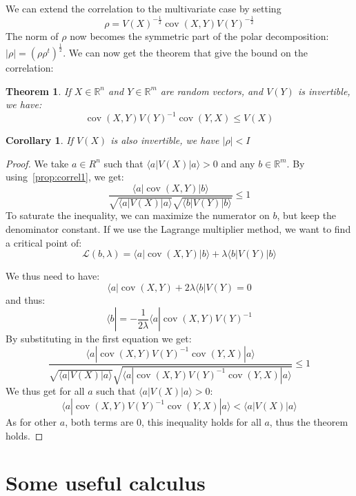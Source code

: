 \documentclass[10pt,a4paper]{report}
\theoremstyle{plain}
\newtheorem{thm}{Theorem}[chapter]
\newtheorem{cor}{Corollary}[thm]
\theoremstyle{definition}
\theoremstyle{remark}
\newcommand{\R}{\ensuremath{\mathbb{R}}}
\newcommand{\TODO}{\textbf{TODO}}
\newcommand{\ket}[1]{|#1\rangle}
\newcommand{\bra}[1]{\langle#1|}
\renewcommand{\leq}{\leqslant}
\DeclareMathOperator{\cov}{cov}
\begin{document}
We can extend the correlation to the multivariate case by setting
\[\rho = {V(X)}^{-\frac12}\cov(X,Y){V(Y)}^{-\frac12}\]
The norm of $\rho$ now becomes the symmetric part of the polar decomposition:  $|\rho|
= {(\rho\rho^t)}^{\frac12}$. We can now get the theorem that give the bound on the
correlation:

\begin{thm}\label{thm:correln}
  If $X \in \R^n$ and $Y \in \R^m$ are random vectors, and $V(Y)$ is invertible,
  we have:
  \[\cov(X,Y){V(Y)}^{-1}\cov(Y,X) \leq V(X)\]
\end{thm}

\begin{cor}
  If $V(X)$ is also invertible, we have $|\rho| < I$
\end{cor}

\begin{proof}
  We take $a \in R^n$ such that $\bra a V(X) \ket a > 0$ and any $b \in \R^m$.
  By using~\cref{prop:correl1}, we get:
  \[ \frac{ \bra a \cov(X,Y) \ket b}{\sqrt{\bra a V(X) \ket a}\sqrt{\bra b V(Y)
        \ket b}} \leq 1\]
  To saturate the inequality, we can maximize the numerator on $b$, but keep the
  denominator constant. If we use the Lagrange multiplier method, we want to
  find a critical point of:
  \[\mathcal{L}(b,\lambda) = \bra a \cov(X,Y) \ket b + \lambda \bra b V(Y) \ket
    b\]

  We thus need to have:
  \[ \bra a \cov(X,Y) + 2\lambda\bra b V(Y) = 0\]
  and thus:
  \[ \bra b = - \frac 1 {2\lambda} \bra a \cov(X,Y) {V(Y)}^{-1}\]
  By substituting in the first equation we get:
  \[ \frac{ \bra a \cov(X,Y) {V(Y)}^{-1} \cov(Y,X) \ket a}
    {\sqrt{\bra a V(X) \ket a}
      \sqrt{\bra a \cov(X,Y) {V(Y)}^{-1} \cov(Y,X) \ket a}} \leq 1\]
  We thus get for all $a$ such that $\bra a V(X) \ket a > 0$:
  \[ \bra a \cov(X,Y) {V(Y)}^{-1} \cov(Y,X) \ket a < \bra a V(X) \ket a\]
  As for other $a$, both terms are 0, this inequality holds for all $a$, thus
  the theorem holds.
\end{proof}




\chapter{Some useful calculus}
\end{document}

